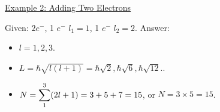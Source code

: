\documentclass{school-22.101-notes}
\begin{document}
\uline{Example 2: Adding Two Electrons}

Given: $ 2e^-$, 1 $e^-$ \@ $l_1 = 1$, 1 $e^-$ \@ $l_2 = 2$. Answer: 
\begin{itemize}
\item $l = 1,2,3$.
\item $L = \hbar \sqrt{l (l+1)} = \hbar \sqrt{2}, \hbar \sqrt{6}, \hbar \sqrt{12}.$.
\item $N = \displaystyle\sum_1^3 (2l+1) = 3 + 5 + 7 = 15$, or $N = 3 \times 5 = 15$. 
\end{itemize}
\end{document}
